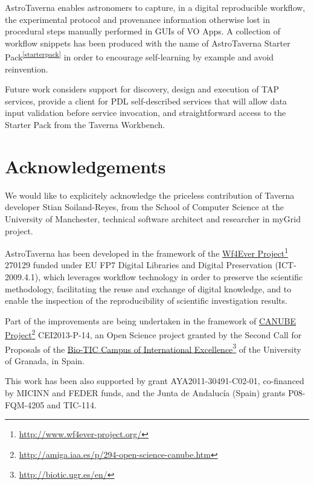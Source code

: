 \documentclass[final,authoryear,5p,times,twocolumn]{elsarticle}
\newcommand{\urlsamefont}[1]{\urlstyle{same}\url{#1}}
\newcommand{\hrefnote}[2]{\href{#1}{#2}\footnote{\urlsamefont{#1}}}
\begin{document}
AstroTaverna  enables astronomers to capture, in a digital reproducible workflow, the experimental protocol and provenance information otherwise lost in procedural steps manually performed in GUIs of VO Apps. A collection of workflow snippets has been produced with the name of AstroTaverna Starter Pack\textsuperscript{\ref{starterpack}} in order to encourage self-learning by example and avoid reinvention.

Future work considers support for discovery, design and execution of TAP services, provide a client for PDL self-described services that will allow data input validation before service invocation, and straightforward access to the Starter Pack from the Taverna Workbench.


\section{Acknowledgements}
\label{Acknowledgements}
We would like to explicitely acknowledge the priceless contribution of Taverna developer Stian Soiland-Reyes, from the School of Computer Science at the University of Manchester, technical software architect and researcher in myGrid project. 

AstroTaverna has been developed in the framework of the \hrefnote{http://www.wf4ever-project.org/}{Wf4Ever Project} 270129 funded under EU FP7 Digital Libraries and Digital Preservation (ICT-2009.4.1), which leverages workflow technology in order to preserve the scientific methodology, facilitating the reuse and exchange of digital knowledge, and to enable the inspection of the reproducibility of scientific investigation results.

Part of the improvements are being undertaken in the framework of \hrefnote{http://amiga.iaa.es/p/294-open-science-canube.htm}{CANUBE Project} CEI2013-P-14, an Open Science project granted by the Second Call for Proposals of the \hrefnote{http://biotic.ugr.es/en/}{Bio-TIC Campus of International Excellence} of the University of Granada, in Spain.

This work has been also supported by grant AYA2011-30491-C02-01, co-financed by MICINN and FEDER funds, and the Junta de Andalucía (Spain) grants P08-FQM-4205 and TIC-114.



\end{document}
